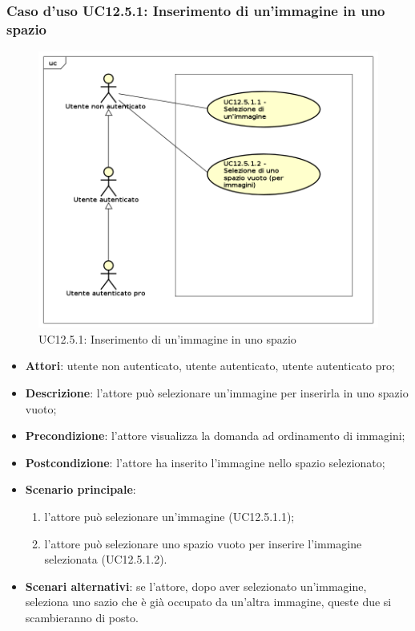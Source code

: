 \subsubsection{Caso d'uso UC12.5.1: Inserimento di un'immagine in uno spazio}
\label{UC12.5.1}
\begin{figure}[h]
	\centering
	\includegraphics[scale=0.5]{UML/UC12_5_1.png}
	\caption{UC12.5.1: Inserimento di un'immagine in uno spazio}
\end{figure}
\begin{itemize}
\item \textbf{Attori}: utente non autenticato, utente autenticato, utente autenticato pro;
\item \textbf{Descrizione}: l'attore può selezionare un'immagine per inserirla in uno spazio vuoto;
\item \textbf{Precondizione}: l'attore visualizza la domanda ad ordinamento di immagini;
\item \textbf{Postcondizione}: l'attore ha inserito l'immagine nello spazio selezionato;
\item \textbf{Scenario principale}: 
\begin{enumerate}
\item l'attore può selezionare un'immagine (UC12.5.1.1);
\item l'attore può selezionare uno spazio vuoto per inserire l'immagine selezionata (UC12.5.1.2).
\end{enumerate}
\item \textbf{Scenari alternativi}: se l'attore, dopo aver selezionato un'immagine, seleziona uno sazio che è già occupato da un'altra immagine, queste due si scambieranno di posto.
\end{itemize}

